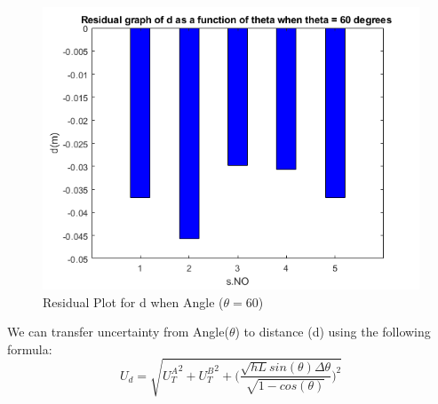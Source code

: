 \begin{figure}[h!]
    \centering
    \includegraphics[width=\textwidth]{figures/d_A4_r.png}
    \caption{Residual Plot for d when Angle  ($\theta = 60$) }
    \label{fig:yx}
\end{figure}
We can transfer uncertainty from Angle($\theta$) to distance (d) using the following formula:
$$ U_d = \sqrt{{U_T^A}^2 +{U_T^B}^2+\biggr({\frac{\sqrt{hL}sin(\theta)\Delta\theta}{\sqrt{1-cos(\theta)}}}\biggr)^2}$$

